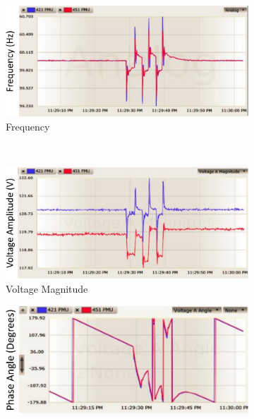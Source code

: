 \begin{figure}[tp]
	\centering
    \begin{subfigure}[b]{0.42\textwidth}
    	\centering
	\includegraphics[width=1\textwidth]{figures/attack1-1}
        \vspace{-0.15in}
        \caption{Frequency}
		\label{fig:attack1-1}
	\end{subfigure}
~\qquad
	\begin{subfigure}[b]{0.42\textwidth}
    	\centering
	\includegraphics[width=1\textwidth]{figures/attack1-2}
        \vspace{-0.15in}
        \caption{Voltage Magnitude}
		\label{fig:attack1-2}
	\end{subfigure}
	\begin{subfigure}[b]{0.42\textwidth}
    	\centering
	\includegraphics[width=1\textwidth]{figures/attack1-3}

\end{subfigure}
\end{figure}

